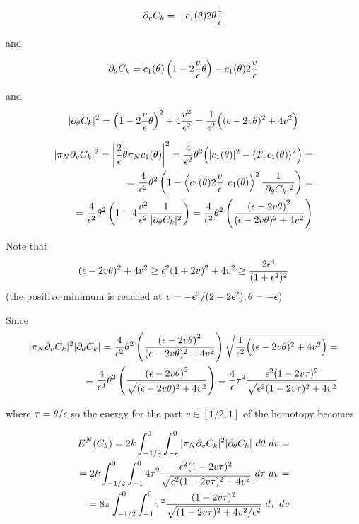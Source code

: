 \documentclass[twoside,a4paper,english]{article}
\def\derpar#1{\partial_{#1}}
\begin{document}
\begin{Proposition}
\begin{enumerate}
\begin{itemize}
   $$\derpar v C_k = -c_1(\theta)2 \theta \frac 1 \e $$

   and

   $$\derpar \theta C_k 
   = \overdot c_1(\theta)\left(1-2\frac{v}{\e} \theta\right)
   - c_1(\theta)2\frac{v}{\e}
   $$
   
   and
   $$|\derpar \theta C_k|^2=\left(1-2\frac{v}{\e} \theta\right)^2
   +4\frac{v^2}{\e^2}
   =\frac{1}{\e^2} \Big((\e- 2v\theta)^2+4v^2\Big)$$

   \begin{eqnarray*}
     |\pi_N\derpar v C_k|^2=
     \left| \frac 2 \e \theta \pi_N c_1 (\theta)  \right|^2
     =\frac 4 {\e^2} \theta^2 \Big( |c_1(\theta)|^2
     - \langle T,c_1(\theta)\rangle^2 \Big)
     =\\=\frac 4 {\e^2} \theta^2 \left(1
       - \left\langle c_1(\theta)2\frac{v}{\e} 
         ,c_1(\theta)\right\rangle^2
       \frac 1 {|\derpar\theta C_k|^2}\right)
     =\\=\frac 4 {\e^2} \theta^2 \left(1
       - 4\frac{v^2}{\e^2}   
       \frac 1 {|\derpar\theta C_k|^2}\right)
     = \frac 4 {\e^2} \theta^2 \left(
       \frac {\left(\e- 2v\theta\right)^2}
     {(\e- 2v\theta)^2+4v^2} \right)
   \end{eqnarray*}   


   Note that 
   \begin{equation}
     \label{eq: den pos}
     (\epsilon- 2v\theta)^2+4v^2\ge \epsilon^2(1+2v)^2+4v^2 \ge
     \frac{2\epsilon^4}{(1+\epsilon^2)^2}
   \end{equation}
   (the positive minimum is reached  at $v=-\epsilon^2/(2+2\epsilon^2), \theta=-\epsilon$)

   Since 
   \begin{eqnarray*}
     |\pi_N\derpar v C_k|^2|\derpar \theta C_k|=
     \frac 4 {\e^2} \theta^2 \left(
       \frac {\left(\e- 2v\theta\right)^2}
       {(\e- 2v\theta)^2+4v^2} \right)
     \sqrt{\frac{1}{\e^2} \Big((\e- 2v\theta)^2+4v^2\Big)}
     =\\=
     \frac 4 {\e^3} \theta^2 \left(
       \frac {\left(\e- 2v\theta\right)^2}
       {\sqrt{(\e- 2v\theta)^2+4v^2}} \right)
     =\frac 4 \e \tau^2 \frac {\e^2(1- 2v\tau)^2}
     {\sqrt{ \e^2(1- 2v\tau)^2+4v^2}}
   \end{eqnarray*}
 
   where $\tau=\theta/\epsilon$
   so the energy for the part $v\in[1/2,1]$ of the homotopy
   becomes

   \begin{eqnarray*}
     E^N(C_k)=2 k \int_{-1/2}^0\int_{-\e}^0
     |\pi_N\derpar v C_k|^2|\derpar \theta C_k|~d\theta~dv
     = \\ =
     2 k \int_{-1/2}^0\int_{-1}^0
     4\tau^2 
     \frac {\e^2(1- 2v\tau)^2}
     {\sqrt{ \e^2(1- 2v\tau)^2+4v^2}}
     ~d\tau~dv
     = \\ =8 \pi  
     \int_{-1/2}^0\int_{-1}^0
     \tau^2 
     \frac {(1- 2v\tau)^2}
     {\sqrt{ (1- 2v\tau)^2+4v^2/\e^2}}
     ~d\tau~dv
   \end{eqnarray*}


\end{itemize}
\end{enumerate}
\end{Proposition}
\end{document}
